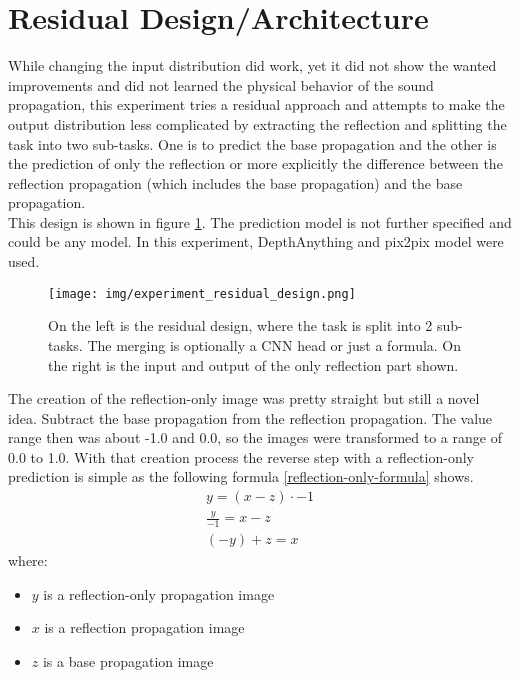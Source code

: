 	\section{Residual Design/Architecture}
	\label{sec:experiments-residual_architecture}
		While changing the input distribution did work, yet it did not show the wanted improvements and did not learned the physical behavior of the sound propagation, this experiment tries a residual approach and attempts to make the output distribution less complicated by extracting the reflection and splitting the task into two sub-tasks. One is to predict the base propagation and the other is the prediction of only the reflection or more explicitly the difference between the reflection propagation (which includes the base propagation) and the base propagation. \\This design is shown in figure \ref{fig:experiment_residual_design}. 
		The prediction model is not further specified and could be any model. In this experiment, DepthAnything and pix2pix model were used.
		\begin{figure}[H]
			\centering
			\texttt{[image: img/experiment\_residual\_design.png]}
			\caption[On the left is the residual design, where the task is split into 2 sub-tasks. The merging is optionally a CNN head or just a formula. On the right is the input and output of the only reflection part shown.]{On the left is the residual design, where the task is split into 2 sub-tasks. The merging is optionally a CNN head or just a formula. On the right is the input and output of the only reflection part shown.}
			\label{fig:experiment_residual_design}
		\end{figure}
		\FloatBarrier
		The creation of the reflection-only image was pretty straight but still a novel idea. Subtract the base propagation from the reflection propagation. The value range then was about -1.0 and 0.0, so the images were transformed to a range of 0.0 to 1.0. With that creation process the reverse step with a reflection-only prediction is simple as the following formula \ref{reflection-only-formula} shows.
		\clearpage
		\begin{align}  %
			\label{reflection-only-formula}
			y = (x - z) \cdot -1 \\
			\frac{y}{-1} = x - z \\
			\left(-y \right) + z = x
		\end{align}
		\noindent where:
		\begin{itemize}[itemsep=1mm, parsep=0pt]
			\item $y$ is a reflection-only propagation image
			\item $x$ is a reflection propagation image
			\item $z$ is a base propagation image
		\end{itemize}
